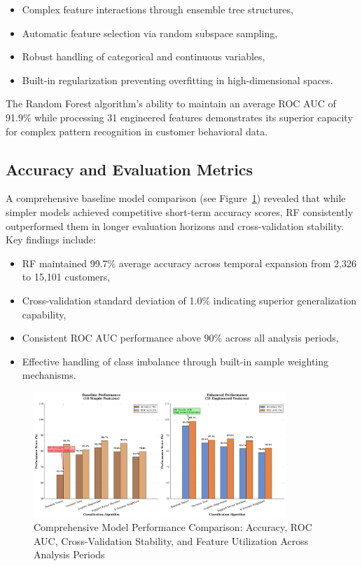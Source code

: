\begin{itemize}
\item Complex feature interactions through ensemble tree structures,
\item Automatic feature selection via random subspace sampling,
\item Robust handling of categorical and continuous variables,
\item Built-in regularization preventing overfitting in high-dimensional spaces.
\end{itemize}

The Random Forest algorithm's ability to maintain an average ROC AUC of 91.9\% while processing 31 engineered features demonstrates its superior capacity for complex pattern recognition in customer behavioral data.

\subsection*{Accuracy and Evaluation Metrics}

A comprehensive baseline model comparison (see Figure~\ref{fig:model_accuracy_comparison}) revealed that while simpler models achieved competitive short-term accuracy scores, RF consistently outperformed them in longer evaluation horizons and cross-validation stability. Key findings include:

\begin{itemize}
\item RF maintained 99.7\% average accuracy across temporal expansion from 2,326 to 15,101 customers,
\item Cross-validation standard deviation of 1.0\% indicating superior generalization capability,
\item Consistent ROC AUC performance above 90\% across all analysis periods,
\item Effective handling of class imbalance through built-in sample weighting mechanisms.
\end{itemize}

\begin{figure}[H]
\centering
\includegraphics[width=0.85\textwidth]{figures/model_accuracy_comparison.png}
\caption{Comprehensive Model Performance Comparison: Accuracy, ROC AUC, Cross-Validation Stability, and Feature Utilization Across Analysis Periods}
\label{fig:model_accuracy_comparison}
\end{figure}

